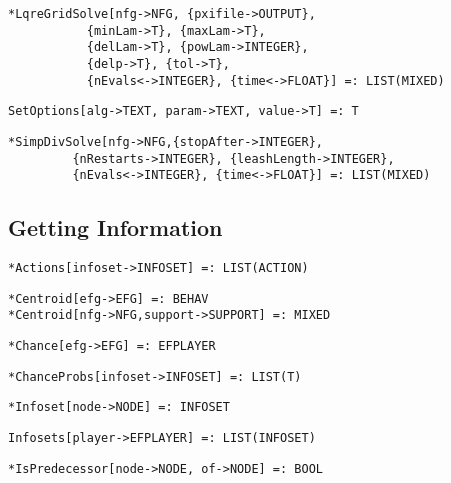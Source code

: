 \protect \large \begin{verbatim}
*LqreGridSolve[nfg->NFG, {pxifile->OUTPUT},
           {minLam->T}, {maxLam->T}, 
           {delLam->T}, {powLam->INTEGER}, 
           {delp->T}, {tol->T},
           {nEvals<->INTEGER}, {time<->FLOAT}] =: LIST(MIXED)
\end{verbatim}\normalsize

\protect \large \begin{verbatim}
SetOptions[alg->TEXT, param->TEXT, value->T] =: T
\end{verbatim}\normalsize

\protect \large \begin{verbatim}
*SimpDivSolve[nfg->NFG,{stopAfter->INTEGER}, 
         {nRestarts->INTEGER}, {leashLength->INTEGER},
         {nEvals<->INTEGER}, {time<->FLOAT}] =: LIST(MIXED)
\end{verbatim}\normalsize

\medskip
\subsection{Getting Information}

\protect \large \begin{verbatim} 
*Actions[infoset->INFOSET] =: LIST(ACTION)
\end{verbatim}\normalsize

\protect \large \begin{verbatim} 
*Centroid[efg->EFG] =: BEHAV
*Centroid[nfg->NFG,support->SUPPORT] =: MIXED
\end{verbatim}\normalsize

\protect \large \begin{verbatim}
*Chance[efg->EFG] =: EFPLAYER
\end{verbatim}\normalsize

\protect \large \begin{verbatim}
*ChanceProbs[infoset->INFOSET] =: LIST(T)
\end{verbatim}\normalsize

\protect \large \begin{verbatim}
*Infoset[node->NODE] =: INFOSET
\end{verbatim}\normalsize

\protect \large \begin{verbatim}
Infosets[player->EFPLAYER] =: LIST(INFOSET)
\end{verbatim}\normalsize

\protect \large \begin{verbatim}
*IsPredecessor[node->NODE, of->NODE] =: BOOL
\end{verbatim}\normalsize

